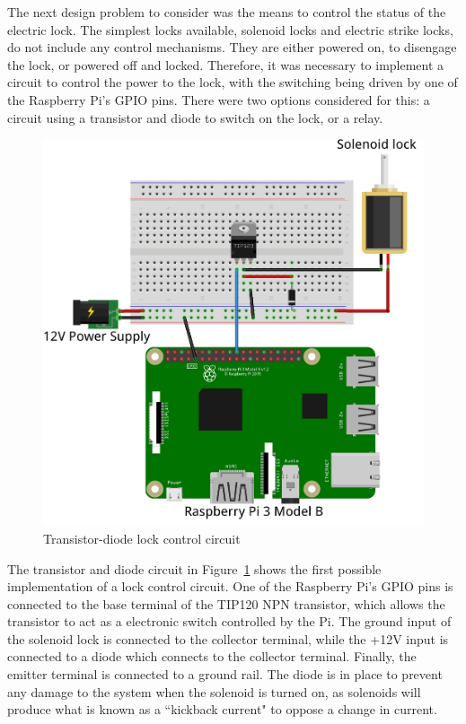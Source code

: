 \documentclass[12pt]{report}
\begin{document}
The next design problem to consider was the means to control the status of the electric lock. The simplest locks 
available, solenoid locks and electric strike locks, do not include any control mechanisms. They are either powered on, 
to disengage the lock, or powered off and locked. Therefore, it was necessary to implement a circuit to control the
power to the lock, with the switching being driven by one of the Raspberry Pi's GPIO pins. There were two options
considered for this: a circuit using a transistor and diode to switch on the lock, or a relay.

\begin{figure}
    \includegraphics[width=\textwidth]{Diagrams/Hardware-Diagrams/diode_transistor_circuit}
    \caption{Transistor-diode lock control circuit}
    \label{fig:transistor-diode-circuit-diagram}
\end{figure}

The transistor and diode circuit in Figure~\ref{fig:transistor-diode-circuit-diagram} shows the first possible 
implementation of a lock control circuit. One of the Raspberry Pi's GPIO pins is connected to the base terminal of the 
TIP120 NPN transistor, which allows the transistor to act as a electronic switch controlled by the Pi. The ground 
input of the solenoid lock is connected to the collector terminal, while the +12V input is connected to a diode which 
connects to the collector terminal. Finally, the emitter terminal is connected to a ground rail. The diode is in place 
to prevent any damage to the system when the solenoid is turned on, as solenoids will produce what is known as a
``kickback current" to oppose a change in current. %
\end{document}
